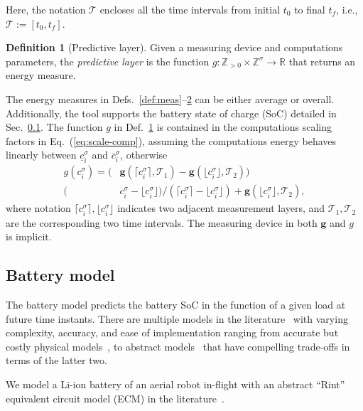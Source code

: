 \documentclass[letterpaper,10pt,journal,twoside]{IEEEtran}
\theoremstyle{definition}
\newtheorem{defn}{Definition}[section]
\begin{document}
Here, the notation $\mathcal{T}$ encloses all the time intervals from initial $t_0$ to final $t_f$, i.e., $\mathcal{T}:=[t_0,t_f]$.

\begin{defn}[Predictive layer]\label{def:pred}
  Given a measuring device and computations parameters, the \emph{predictive layer} is the function $g:\mathbb{Z}_{>0}\times\mathbb{Z}^\sigma\rightarrow\mathbb{R}$ that returns an energy measure.
\end{defn}

The energy measures in Defs.~\ref{def:meas}--\hyperref[def:pred]{2} can be either average or overall. Additionally, the tool supports the battery state of charge (SoC) detailed in Sec.~\ref{sec:mod-bat}. The function $g$ in Def.~\ref{def:pred} is contained in the computations scaling factors in Eq.~(\ref{eq:scale-comp}), assuming the computations energy behaves linearly between $\underline{c}_i^\sigma$ and $\overline{c}_i^\sigma$, otherwise
\begin{equation}\label{eq:piece-wise-reg}\begin{split}
  g(c_i^\sigma)=(&\mathbf{g}(\lceil c_i^\sigma\rceil,\mathcal{T}_1)-\mathbf{g}(\lfloor c_i^\sigma\rfloor,\mathcal{T}_2))\\(&c_i^\sigma-\lfloor c_i^\sigma\rfloor)/(\lceil c_i^\sigma\rceil-\lfloor c_i^\sigma\rfloor)+\mathbf{g}(\lfloor c_i^\sigma\rfloor,\mathcal{T}_2),
\end{split}\end{equation}
where notation $\lceil c_i^\sigma\rceil,\lfloor c_i^\sigma\rfloor$ indicates two adjacent measurement layers, and $\mathcal{T}_1,\mathcal{T}_2$ are the corresponding two time intervals. The measuring device in both $\mathbf{g}$ and $g$ is implicit.

\subsection{Battery model}
\label{sec:mod-bat}

The battery model predicts the battery SoC in the function of a given load at future time instants. There are multiple models in the literature~\cite{rao2003battery} with varying complexity, accuracy, and ease of implementation ranging from accurate but costly physical models~\cite{moura2017battery,marcicki2013design}, to abstract models~\cite{xing2014state,he2011evaluation,hinz2019comparison,mousavi2014various} that have compelling trade-offs in terms of the latter two. 

We model a Li-ion battery of an aerial robot in-flight with an abstract ``Rint'' equivalent circuit model (ECM) in the literature~\cite{he2011evaluation,hinz2019comparison,mousavi2014various}.
\end{document}
